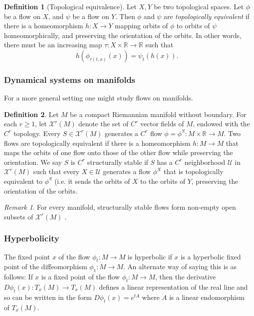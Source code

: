 \documentclass{article}
\theoremstyle{definition}
\newtheorem{definition}{Definition}
\theoremstyle{remark}
\newtheorem{remark}{Remark}
\newcommand{\reals}{\mathbb{R}}
\newcommand{\mcU}{\mathcal{U}}
\newcommand{\mcX}{\mathcal{X}}
\newcounter{ct}
\begin{document}
\begin{definition}[Topological equivalence]
Let $X,Y$ be two topological spaces. Let $\phi$ be a flow on $X$, and $\psi$ be a flow on $Y$.
Then $\phi$ and $\psi$ are \emph{topologically equivalent} if there is a homeomorphism $h\colon X\to Y$ mapping orbits of  $\phi$  to orbits of $\psi$  homeomorphically, and preserving the orientation of the orbits. In other words, there must be  an increasing map $\tau\colon X\times\reals\rightarrow\reals$ such that 
\begin{equation}\label{eq:topeq}
h(\phi_{\tau(t,x)}(x)) = \psi_t(h(x)).
\end{equation}
\end{definition}


\subsubsection{Dynamical systems on manifolds}
For a more general setting one might study flows on manifolds.
\begin{definition}
Let $M$ be a compact Riemannian manifold without boundary. For each $r\geq 1$, let $\mcX^r(M)$ denote the set of $C^r$ vector fields of $M$, endowed with the $C^r$ topology. Every $S\in \mcX^r(M)$ generates a $C^r$ flow $\phi=\phi^S\colon M\times \reals\rightarrow M$.
Two flows are topologically equivalent if there is a homeomorphism $h\colon M\rightarrow M$ that maps the orbits of one flow onto those of the other flow while preserving the orientation. 
 We say $S$ is $C^r$ structurally stable if $S$ has a $C^r$ neighborhood $\mcU$ in $\mcX^r(M)$ such that every $X \in \mcU$ generates a flow $\phi^X$ that is topologically equivalent to $\phi^S$ (i.e. it sends the orbits of $X$ to the orbits of $Y$, preserving the orientation of the orbits.
\end{definition}

\begin{remark}
For every manifold, structurally stable flows form non-empty open subsets of $\mcX^r(M)$ \citep{palis1970ss}.
\end{remark}

\subsubsection{Hyperbolicity}
The fixed point $x$ of the flow $\phi_t\colon M\rightarrow M$ is hyperbolic if $x$ is a hyperbolic fixed point of the diffeomorphism $\phi_1: M\rightarrow M$.
 An alternate way of saying this is as follows: If $x$ is a fixed point of the flow $\phi_t\colon M\rightarrow M$, then the derivative $D\phi_t(x)\colon T_x(M)\rightarrow T_x(M)$ defines a linear representation of the real line and so can be written in the form $D\phi_t(x)=e^{tA}$ where $A$ is a linear endomorphism of $T_x(M)$.
\end{document}
